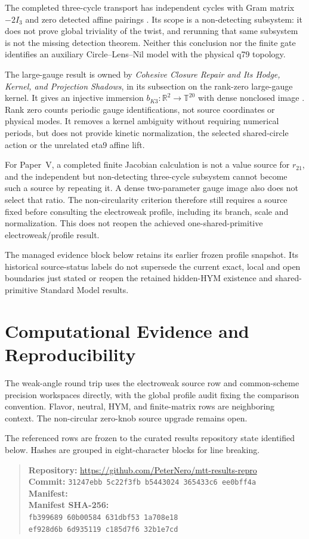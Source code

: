 \documentclass[11pt]{article}
\begin{document}
The completed three-cycle transport has independent cycles with Gram matrix
$-2I_3$ and zero detected affine pairings \cite{ThetaCycles}. Its scope is
a non-detecting subsystem: it does not prove global triviality of the twist,
and rerunning that same subsystem is not the missing detection theorem.
Neither this conclusion nor the finite gate identifies an auxiliary
Circle--Lens--Nil model with the physical q79 topology.

The large-gauge result is owned by \emph{Cohesive Closure Repair and Its
Hodge, Kernel, and Projection Shadows}, in its subsection on the rank-zero
large-gauge kernel. It gives an injective immersion
$b_{K3}:\mathbb R^2\to\mathbb T^{20}$ with dense nonclosed image
\cite{ThetaBK3}. Rank zero counts periodic gauge identifications, not source
coordinates or physical modes. It removes a kernel ambiguity without
requiring numerical periods, but does not provide kinetic normalization,
the selected shared-circle action or the unrelated eta9 affine lift.

For Paper~V, a completed finite Jacobian calculation is not a value source
for $r_{21}$, and the independent but non-detecting three-cycle subsystem
cannot become such a source by repeating it. A dense two-parameter gauge
image also does not select that ratio. The non-circularity criterion
therefore still requires a source fixed before consulting the electroweak
profile, including its branch, scale and normalization. This does not reopen
the achieved one-shared-primitive electroweak/profile result.


The managed evidence block below retains its earlier frozen profile snapshot.
Its historical source-status labels do not supersede the current exact,
local and open boundaries just stated or reopen the retained hidden-HYM
existence and shared-primitive Standard Model results.

\section*{Computational Evidence and Reproducibility}
The weak-angle round trip uses the electroweak source row and common-scheme precision workspaces directly, with the global profile audit fixing the comparison convention. Flavor, neutral, HYM, and finite-matrix rows are neighboring context. The non-circular zero-knob source upgrade remains open.

The referenced rows are frozen to the curated results repository state identified below. Hashes are grouped in eight-character blocks for line breaking.
\begin{quote}\small
\textbf{Repository:} \url{https://github.com/PeterNero/mtt-results-repro}\\
\textbf{Commit:} \texttt{31247ebb 5c22f3fb b5443024 365433c6 ee0bff4a}\\
\textbf{Manifest:} \\
\textbf{Manifest SHA-256:}\\
\texttt{fb399689 60b00584 631dbf53 1a708e18}\\
\texttt{ef928d6b 6d935119 c185d7f6 32b1e7cd}
\end{quote}
\end{document}
